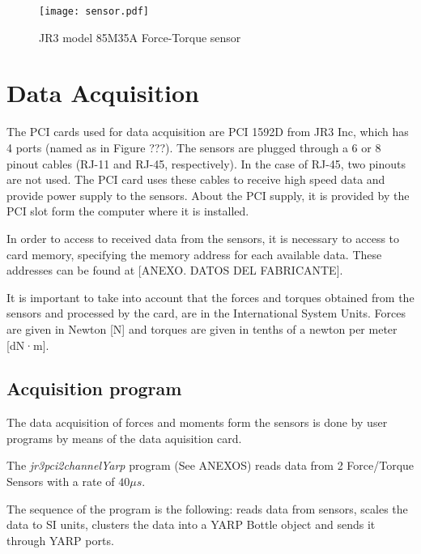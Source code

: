 \begin{figure}[!hbt]
\centering
\texttt{[image: sensor.pdf]}
\label{fig:sensor}
\caption{JR3 model 85M35A Force-Torque sensor}
\end{figure}

\section{Data Acquisition}
The PCI cards used for data acquisition are PCI 1592D from JR3 Inc, which has 4 ports (named as in Figure ???). The sensors are plugged through a 6 or 8 pinout cables (RJ-11 and RJ-45, respectively). In the case of RJ-45, two pinouts are not used. The PCI card uses these cables to receive high speed data and provide power supply to the sensors. About the PCI supply, it is provided by the PCI slot form the computer where it is installed.

In order to access to received data from the sensors, it is necessary to access to card memory, specifying the memory address for each available data. These addresses can be found at [ANEXO. DATOS DEL FABRICANTE].

It is important to take into account that the forces and torques obtained from the sensors and processed by the card, are in the International System Units. Forces are given in Newton [N] and torques are given in tenths of a newton per meter [dN·m].

\subsection{Acquisition program}
The data acquisition of forces and moments form the sensors is done by user programs by means of the data aquisition card. 

The \textit{jr3pci2channelYarp} program (See ANEXOS) reads data from 2 Force/Torque Sensors with a rate of $40 \mu s$.

The sequence of the program is the following: reads data from sensors, scales the data to SI units, clusters the data into a YARP Bottle object and sends it through YARP ports.
